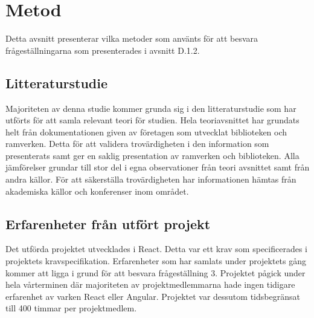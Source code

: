 \section{Metod}
\label{sec:axel-method}

Detta avsnitt presenterar vilka metoder som använts för att besvara frågeställningarna som presenterades i avsnitt D.1.2.

\subsection{Litteraturstudie}
Majoriteten av denna studie kommer grunda sig i den litteraturstudie som har utförts för att samla relevant teori för studien. Hela teoriavsnittet har grundats helt från dokumentationen given av företagen som utvecklat biblioteken och ramverken. Detta för att validera trovärdigheten i den information som presenterats samt ger en saklig presentation av ramverken och biblioteken. Alla jämförelser grundar till stor del i egna observationer från teori avsnittet samt från andra källor. För att säkerställa trovärdigheten har informationen hämtas från akademiska källor och konferenser inom området.

\subsection{Erfarenheter från utfört projekt}
Det utförda projektet utvecklades i React. Detta var ett krav som specificerades i projektets kravspecifikation. Erfarenheter som har samlats under projektets gång kommer att ligga i grund för att besvara frågeställning 3. Projektet pågick under hela vårterminen där majoriteten av projektmedlemmarna hade ingen tidigare erfarenhet av varken React eller Angular. Projektet var dessutom tidsbegränsat till 400 timmar per projektmedlem. 
